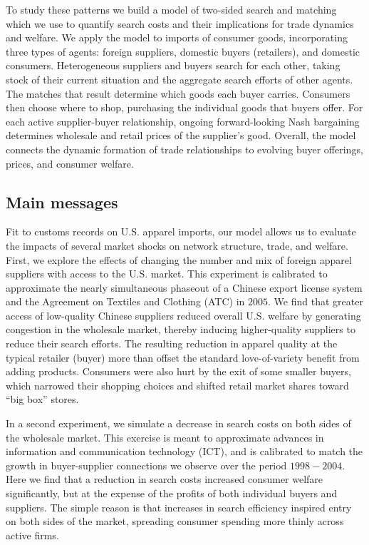 \documentclass[12pt]{article} \usepackage{amsmath,amssymb,amsthm,geometry,graphicx,setspace,algorithm,algpseudocode,float}
\newcommand{\quotes}[1]{``#1''}
\begin{document}
To study these patterns we build a model of two-sided search and matching which we use to quantify search costs and their implications for trade dynamics and welfare. We apply the model to imports of consumer goods, incorporating three types of agents: foreign suppliers, domestic buyers (retailers), and
domestic consumers. Heterogeneous suppliers and buyers search for each other, taking stock of their current situation and the aggregate search efforts of other agents. The matches that result determine which goods each buyer carries. Consumers then choose where to shop, purchasing the individual goods that buyers offer. For each active supplier-buyer relationship, ongoing forward-looking Nash bargaining determines wholesale and retail prices of the supplier's good. Overall, the model connects the dynamic formation of trade relationships to evolving buyer offerings, prices, and consumer welfare. 

\subsection{Main messages}
Fit to customs records on U.S. apparel imports, our model allows us to evaluate the impacts of several market shocks on network structure, trade, and welfare. First, we explore the effects of changing the number and mix of foreign apparel suppliers with access to the U.S. market. This experiment is calibrated to approximate the nearly simultaneous phaseout of a Chinese export license system and the Agreement on Textiles and Clothing (ATC) in $2005$. We find that greater access of low-quality Chinese suppliers reduced overall U.S. welfare by generating congestion in the wholesale market, thereby inducing higher-quality suppliers to reduce their search efforts. The resulting reduction in apparel quality at the typical retailer (buyer) more than offset the standard love-of-variety benefit from adding products. Consumers were also hurt by the exit of some smaller buyers, which narrowed their shopping choices and shifted retail market shares toward \quotes{big box} stores.

In a second experiment, we simulate a decrease in search costs on both sides of the wholesale market. This exercise is meant to approximate advances in information and communication technology (ICT), and is calibrated to match the growth in buyer-supplier connections we observe over the period $1998-2004$.  Here we find that a reduction in search costs increased consumer welfare significantly, but at the expense of the profits of both individual buyers and suppliers. The simple reason is that increases in search efficiency inspired entry on both sides of the market, spreading consumer spending more thinly across active firms.
\end{document}
